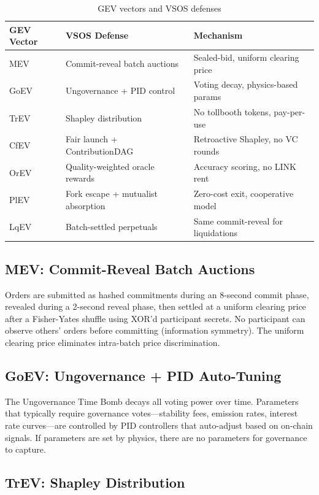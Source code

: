 \documentclass[11pt, a4paper]{article}
\begin{document}
\begin{table}[h]
\centering
\caption{GEV vectors and VSOS defenses}
\label{tab:defenses}
\begin{tabular}{@{}lll@{}}
\toprule
\textbf{GEV Vector} & \textbf{VSOS Defense} & \textbf{Mechanism} \\
\midrule
MEV & Commit-reveal batch auctions & Sealed-bid, uniform clearing price \\
GoEV & Ungovernance + PID control & Voting decay, physics-based params \\
TrEV & Shapley distribution & No tollbooth tokens, pay-per-use \\
CfEV & Fair launch + ContributionDAG & Retroactive Shapley, no VC rounds \\
OrEV & Quality-weighted oracle rewards & Accuracy scoring, no LINK rent \\
PlEV & Fork escape + mutualist absorption & Zero-cost exit, cooperative model \\
LqEV & Batch-settled perpetuals & Same commit-reveal for liquidations \\
\bottomrule
\end{tabular}
\end{table}

\subsection{MEV: Commit-Reveal Batch Auctions}

Orders are submitted as hashed commitments during an 8-second commit phase, revealed during a 2-second reveal phase, then settled at a uniform clearing price after a Fisher-Yates shuffle using XOR'd participant secrets. No participant can observe others' orders before committing (information symmetry). The uniform clearing price eliminates intra-batch price discrimination.

\subsection{GoEV: Ungovernance + PID Auto-Tuning}

The Ungovernance Time Bomb decays all voting power over time. Parameters that typically require governance votes---stability fees, emission rates, interest rate curves---are controlled by PID controllers that auto-adjust based on on-chain signals. If parameters are set by physics, there are no parameters for governance to capture.

\subsection{TrEV: Shapley Distribution}
\end{document}
